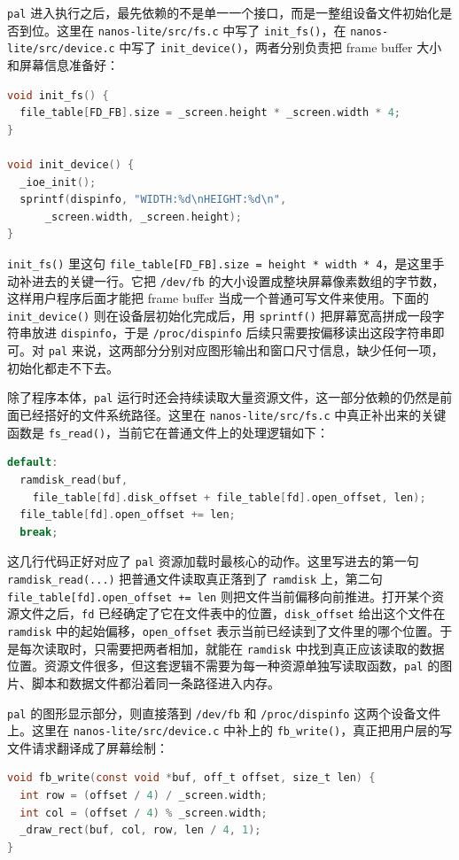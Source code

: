 \documentclass[a4paper]{article}
\begin{document}
\texttt{pal} 进入执行之后，最先依赖的不是单一一个接口，而是一整组设备文件初始化是否到位。这里在 \texttt{nanos-lite/src/fs.c} 中写了 \texttt{init\_fs()}，在 \texttt{nanos-lite/src/device.c} 中写了 \texttt{init\_device()}，两者分别负责把 frame buffer 大小和屏幕信息准备好：
\begin{lstlisting}[language=C]
void init_fs() {
  file_table[FD_FB].size = _screen.height * _screen.width * 4;
}

void init_device() {
  _ioe_init();
  sprintf(dispinfo, "WIDTH:%d\nHEIGHT:%d\n",
      _screen.width, _screen.height);
}
\end{lstlisting}

\texttt{init\_fs()} 里这句 \texttt{file\_table[FD\_FB].size = height * width * 4}，是这里手动补进去的关键一行。它把 \texttt{/dev/fb} 的大小设置成整块屏幕像素数组的字节数，这样用户程序后面才能把 frame buffer 当成一个普通可写文件来使用。下面的 \texttt{init\_device()} 则在设备层初始化完成后，用 \texttt{sprintf()} 把屏幕宽高拼成一段字符串放进 \texttt{dispinfo}，于是 \texttt{/proc/dispinfo} 后续只需要按偏移读出这段字符串即可。对 \texttt{pal} 来说，这两部分分别对应图形输出和窗口尺寸信息，缺少任何一项，初始化都走不下去。

除了程序本体，\texttt{pal} 运行时还会持续读取大量资源文件，这一部分依赖的仍然是前面已经搭好的文件系统路径。这里在 \texttt{nanos-lite/src/fs.c} 中真正补出来的关键函数是 \texttt{fs\_read()}，当前它在普通文件上的处理逻辑如下：
\begin{lstlisting}[language=C]
default:
  ramdisk_read(buf,
    file_table[fd].disk_offset + file_table[fd].open_offset, len);
  file_table[fd].open_offset += len;
  break;
\end{lstlisting}

这几行代码正好对应了 \texttt{pal} 资源加载时最核心的动作。这里写进去的第一句 \texttt{ramdisk\_read(...)} 把普通文件读取真正落到了 \texttt{ramdisk} 上，第二句 \texttt{file\_table[fd].open\_offset += len} 则把文件当前偏移向前推进。打开某个资源文件之后，\texttt{fd} 已经确定了它在文件表中的位置，\texttt{disk\_offset} 给出这个文件在 \texttt{ramdisk} 中的起始偏移，\texttt{open\_offset} 表示当前已经读到了文件里的哪个位置。于是每次读取时，只需要把两者相加，就能在 \texttt{ramdisk} 中找到真正应该读取的数据位置。资源文件很多，但这套逻辑不需要为每一种资源单独写读取函数，\texttt{pal} 的图片、脚本和数据文件都沿着同一条路径进入内存。

\texttt{pal} 的图形显示部分，则直接落到 \texttt{/dev/fb} 和 \texttt{/proc/dispinfo} 这两个设备文件上。这里在 \texttt{nanos-lite/src/device.c} 中补上的 \texttt{fb\_write()}，真正把用户层的写文件请求翻译成了屏幕绘制：
\begin{lstlisting}[language=C]
void fb_write(const void *buf, off_t offset, size_t len) {
  int row = (offset / 4) / _screen.width;
  int col = (offset / 4) % _screen.width;
  _draw_rect(buf, col, row, len / 4, 1);
}
\end{lstlisting}
\end{document}

